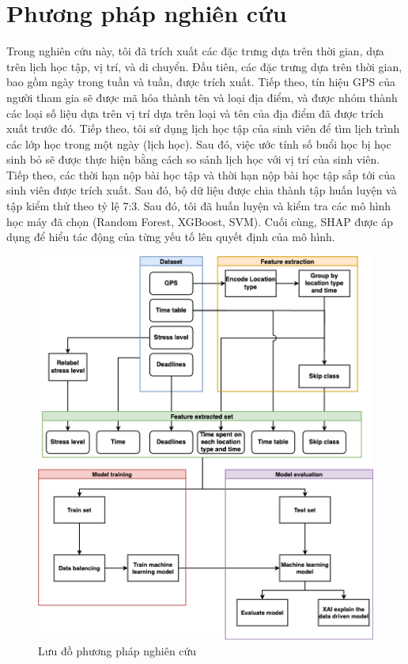 \chapter{Phương pháp nghiên cứu}
Trong nghiên cứu này, tôi đã trích xuất các đặc trưng dựa trên thời gian, dựa trên lịch học tập, vị trí, và di chuyển. Đầu tiên, các đặc trưng dựa trên thời gian, bao gồm ngày trong tuần và tuần, được trích xuất. Tiếp theo, tín hiệu GPS của người tham gia sẽ được mã hóa thành tên và loại địa điểm, và được nhóm thành các loại số liệu dựa trên vị trí dựa trên loại và tên của địa điểm đã được trích xuất trước đó. Tiếp theo, tôi sử dụng lịch học tập của sinh viên để tìm lịch trình các lớp học trong một ngày (lịch học). Sau đó, việc ước tính số buổi học bị học sinh bỏ sẽ được thực hiện bằng cách so sánh lịch học với vị trí của sinh viên. Tiếp theo, các thời hạn nộp bài học tập và thời hạn nộp bài học tập sắp tới của sinh viên được trích xuất. Sau đó, bộ dữ liệu được chia thành tập huấn luyện và tập kiểm thử theo tỷ lệ 7:3. Sau đó, tôi đã huấn luyện và kiểm tra các mô hình học máy đã chọn (Random Forest, XGBoost, SVM). Cuối cùng, SHAP được áp dụng để hiểu tác động của từng yếu tố lên quyết định của mô hình.

\begin{figure}
    \centering
    \includegraphics[width=\linewidth]{Images/pipeline_stress.drawio.png}
    \caption{Lưu đồ phương pháp nghiên cứu}
    \label{fig:enter-label}
\end{figure}


